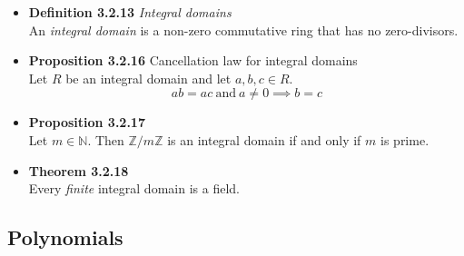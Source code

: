 \documentclass[11pt,a4paper]{article}
\begin{document}
\begin{itemize}
    \item \textbf{Definition 3.2.13} \emph{Integral domains} \\
        An \emph{integral domain} is a non-zero commutative ring that has no zero-divisors.

    \item \textbf{Proposition 3.2.16} Cancellation law for integral domains \\
        Let $R$ be an integral domain and let $a,b,c \in R$.
        \[
            ab = ac \ \text{and} \ a \neq 0 \implies b = c
        \]

    \item \textbf{Proposition 3.2.17} \\
        Let $m \in \mathbb{N}$.
        Then $\mathbb{Z}/m\mathbb{Z}$ is an integral domain if and only if $m$ is prime.

    \item \textbf{Theorem 3.2.18} \\
        Every \emph{finite} integral domain is a field.

\end{itemize}

\subsection{Polynomials}
\end{document}
